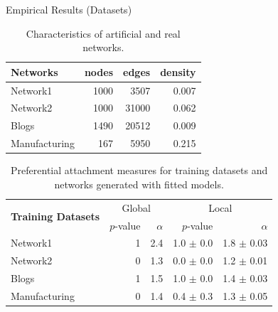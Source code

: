 \begin{frame}[c]{Empirical Results (Datasets)}

    \vspace{-0.2cm}
\begin{table}[h] 
	\centering
	\caption{Characteristics of artificial and real networks.}
    \begin{tabular}{lrrr}
        \hline
        \textbf{Networks} &   nodes &   edges &   density \\
        \hline
        Network1 &    1000 &    3507 &     0.007 \\
        Network2 &    1000 &   31000 &     0.062 \\
        Blogs         &    1490 &   20512 &     0.009 \\
        Manufacturing &     167 &    5950 &     0.215 \\
    \hline
    \end{tabular}
	\label{table:networks_measures}
\end{table}

\begin{table}[t]
\caption{Preferential attachment measures for training datasets and networks generated with fitted models.}
\centering
\begin{tabular}{lrrrr}
  \multirow{2}{*}{\textbf{Training Datasets}}  &
  \multicolumn{2}{c}{Global} & \multicolumn{2}{c}{Local}\\
  \cmidrule(r){2-3} \cmidrule(l){4-5}
  &   $p$-value &   $\alpha$   & $p$-value & $\alpha$   \\
\hline
Network1       & 1 & 2.4 &   1.0 $\pm$ 0.0  &  1.8 $\pm$ 0.03  \\
Network2       & 0 & 1.3 &   0.0 $\pm$ 0.0  &  1.2 $\pm$ 0.01 \\
Blogs          & 1 & 1.5 &   1.0 $\pm$ 0.0  &  1.4 $\pm$ 0.03\\
Manufacturing  & 0 & 1.4 &   0.4 $\pm$ 0.3  &  1.3 $\pm$ 0.05 \\
\hline
\end{tabular}
\label{table:me_gofit}
\end{table}

\end{frame}

